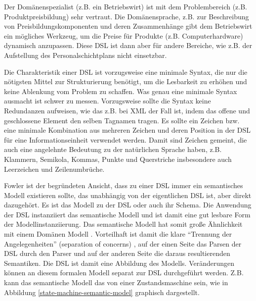\documentclass[11pt,english,ngerman, headsepline]{scrreprt}
\begin{document}
Der Domänenspezialist (z.B. ein Betriebswirt) ist mit dem Problembereich (z.B.
Produktpreisbildung) sehr vertraut. Die Domänensprache, z.B. zur Beschreibung
von Preisbildungskomponenten und deren Zusammenhänge gibt dem Betriebswirt ein
mögliches Werkzeug, um die Preise für Produkte (z.B. Computerhardware) dynamisch
anzupassen. Diese DSL ist dann aber für andere Bereiche, wie z.B.
der Aufstellung des Personalschichtplans nicht einsetzbar.

Die Charakteristik einer DSL ist vorzugsweise eine minimale Syntax, die nur
die nötigsten Mittel zur Strukturierung benötigt, um die Lesbarkeit zu erhöhen
und keine Ablenkung vom Problem zu schaffen. 
Was genau eine minimale Syntax ausmacht ist schwer zu messen.
Vorzugsweise sollte die Syntax keine Redundanzen aufweisen, wie das z.B. bei
XML der Fall ist, indem das offene und geschlossene Element den selben
Tagnamen tragen. Es sollte ein Zeichen bzw. eine minimale
Kombination aus mehreren Zeichen und deren Position in der DSL für eine Informationseinheit
verwendet werden.   Damit sind Zeichen gemeint, die auch eine angelehnte
Bedeutung zu der natürlichen Sprache haben, z.B. Klammern, Semikola, Kommas,
Punkte und Querstriche insbesondere auch Leerzeichen und
Zeilenumbrüche.

Fowler ist der begründeten Ansicht, dass zu einer DSL immer ein semantisches
Modell \cite[p. 159]{fowler2011domain} existieren sollte, das unabhängig von
der eigentlichen DSL ist, aber direkt dazugehört. Es ist das Modell zu der DSL 
oder auch ihr Schema. Die Anwendung der DSL instanziiert das semantische
Modell und ist damit eine gut lesbare Form der Modellinstanziierung. Das semantische Modell hat somit
große Ähnlichkeit mit einem Domänen Modell \cite[]{fowler2003patterns}.
Vorteilhaft ist damit die klare ``Trennung der Angelegenheiten'' (separation of
concerns) \cite{Huersch95separationof}, auf der einen Seite das Parsen der DSL
durch den Parser und auf der anderen Seite die daraus resultierenden Semantiken.
Die DSL ist damit eine Abbildung des Modells. Veränderungen können an diesem
formalen Modell separat zur DSL durchgeführt werden. Z.B. kann das semantische
Modell das von einer Zustandsmaschine sein, wie in Abbildung
\ref{state-machine-semantic-model} graphisch dargestellt.
\end{document}
